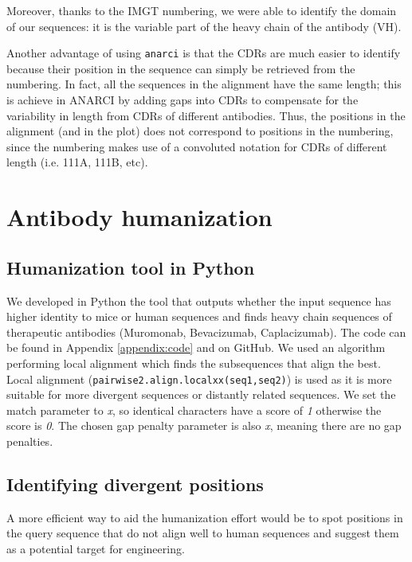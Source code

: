 \documentclass[11pt]{article}
\begin{document}
Moreover, thanks to the IMGT numbering, we were able to identify the domain of our sequences: it is the variable part of the heavy chain of the antibody (VH).

Another advantage of using \verb|anarci| is that the CDRs are much easier to identify because their position in the sequence can simply be retrieved from the numbering. In fact, all the sequences in the alignment have the same length; this is achieve in ANARCI by adding gaps into CDRs to compensate for the variability in length from CDRs of different antibodies. Thus, the positions in the alignment (and in the plot) does not correspond to positions in the numbering, since the numbering makes use of a convoluted notation for CDRs of different length (i.e. 111A, 111B, etc).



\section{Antibody humanization}


\subsection{Humanization tool in Python}

We developed in Python the tool that outputs whether the input sequence has higher identity to mice or human sequences and finds heavy chain sequences of therapeutic antibodies (Muromonab, Bevacizumab, Caplacizumab). The code can be found in Appendix \ref{appendix:code} and on GitHub. We used an algorithm performing local alignment which finds the subsequences that align the best. Local alignment (\verb|pairwise2.align.localxx(seq1,seq2)|) is used as it is more suitable for more divergent sequences or distantly related sequences. We set the match parameter to  \textit{x}, so identical characters have a score of \textit{1} otherwise the score is \textit{0}. The chosen gap penalty parameter is also \textit{x}, meaning there are no gap penalties.




\subsection{Identifying divergent positions}

A more efficient way to aid the humanization effort would be to spot positions in the query sequence that do not align well to human sequences and suggest them as a potential target for engineering. 
\end{document}
